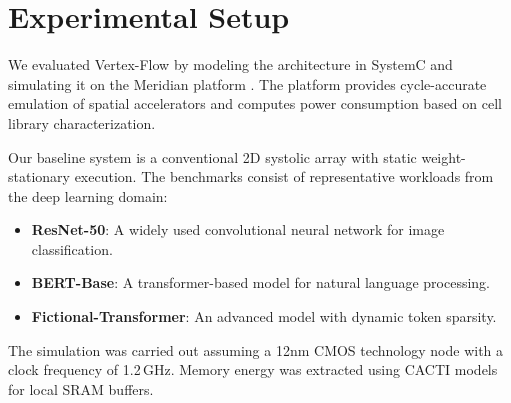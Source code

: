 \section{Experimental Setup}
\label{sec:setup}
We evaluated Vertex-Flow by modeling the architecture in SystemC and simulating it on the Meridian platform \cite{meridian2021}. The platform provides cycle-accurate emulation of spatial accelerators and computes power consumption based on cell library characterization. 

Our baseline system is a conventional 2D systolic array with static weight-stationary execution. The benchmarks consist of representative workloads from the deep learning domain:
\begin{itemize}
  \item \textbf{ResNet-50}: A widely used convolutional neural network for image classification.
  \item \textbf{BERT-Base}: A transformer-based model for natural language processing.
  \item \textbf{Fictional-Transformer}: An advanced model with dynamic token sparsity.
\end{itemize}

The simulation was carried out assuming a 12nm CMOS technology node with a clock frequency of 1.2\,GHz. Memory energy was extracted using CACTI models for local SRAM buffers.

